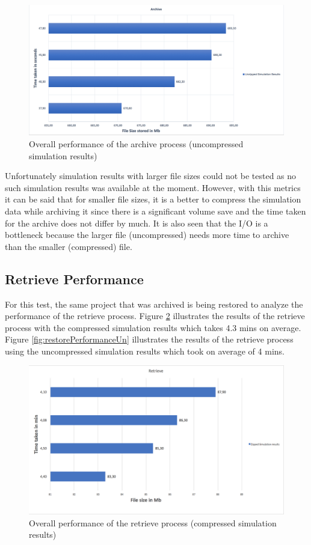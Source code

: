 \begin{figure}[H]
    \centering \includegraphics[scale=0.45]{grafiken/archiveUnzip.png}
    \caption{Overall performance of the archive process (uncompressed simulation results)}
    \label{fig:archivePerformanceUn}
\end{figure}

Unfortunately simulation results with larger file sizes could not be tested as no such simulation results was available at the moment. However, with this metrics it can be said that
for smaller file sizes, it is a better to compress the simulation data while archiving it since there is a significant volume save and the time taken for the
archive does not differ by much. It is also seen that the I/O is a bottleneck because the larger file (uncompressed) needs more time to archive than the smaller (compressed) file. 

\subsection{Retrieve Performance}
For this test, the same project that was archived is being restored to analyze the performance of the retrieve process. Figure \ref{fig:restorePerformance} illustrates
the results of the retrieve process with the compressed simulation results which takes 4.3 mins on average. Figure \ref{fig:restorePerformanceUn} illustrates the
results of the retrieve process using the uncompressed simulation results which took on average of 4 mins. 

\begin{figure}[H]
    \centering \includegraphics[scale=0.5]{grafiken/retrieveZip.png}
    \caption{Overall performance of the retrieve process (compressed simulation results)}
    \label{fig:restorePerformance}
\end{figure}

